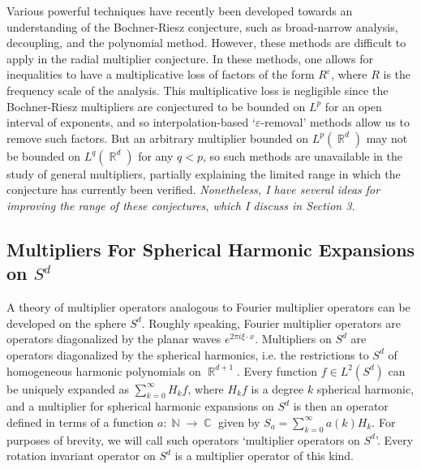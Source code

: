 \documentclass[11pt]{article}
\DeclareMathOperator{\RR}{\mathbb{R}}
\DeclareMathOperator{\NN}{\mathbb{N}}
\DeclareMathOperator{\CC}{\mathbb{C}}
\begin{document}
Various powerful techniques have recently been developed towards an understanding of the Bochner-Riesz conjecture, such as broad-narrow analysis, decoupling, and the polynomial method. However, these methods are difficult to apply in the radial multiplier conjecture. In these methods, one allows for inequalities to have a multiplicative loss of factors of the form $R^\varepsilon$, where $R$ is the frequency scale of the analysis. This multiplicative loss is negligible since the Bochner-Riesz multipliers are conjectured to be bounded on $L^p$ for an open interval of exponents, and so interpolation-based `$\varepsilon$-removal' methods allow us to remove such factors.
But an arbitrary multiplier bounded on $L^p(\RR^d)$ may not be bounded on $L^q(\RR^d)$ for any $q < p$, so such methods are unavailable in the study of general multipliers, partially explaining the limited range in which the conjecture has currently been verified. \emph{Nonetheless, I have several ideas for improving the range of these conjectures, which I discuss in Section 3.}

\subsection{Multipliers For Spherical Harmonic Expansions on $S^d$}

A theory of multiplier operators analogous to Fourier multiplier operators can be developed on the sphere $S^d$. Roughly speaking, Fourier multiplier operators are operators diagonalized by the planar waves $e^{2 \pi i \xi \cdot x}$. Multipliers on $S^d$ are operators diagonalized by the spherical harmonics, i.e. the restrictions to $S^d$ of homogeneous harmonic polynomials on $\RR^{d+1}$. Every function $f \in L^2(S^d)$ can be uniquely expanded as $\sum_{k = 0}^\infty H_k f$, where $H_k f$ is a degree $k$ spherical harmonic, and a multiplier for spherical harmonic expansions on $S^d$ is then an operator defined in terms of a function $a: \NN \to \CC$ given by $S_a = \sum_{k = 0}^\infty a(k) H_k$.
%
%
For purposes of brevity, we will call such operators `multiplier operators on $S^d$'. Every rotation invariant operator on $S^d$ is a multiplier operator of this kind. %
\end{document}
